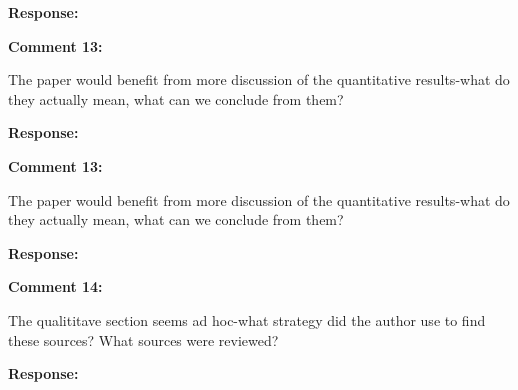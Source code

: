 \documentclass[12pt, a4paper, notitlepage]{article}
\begin{document}
\noindent\textbf{Response:}



\vspace{15pt}
\noindent\textbf{Comment 13:}
\begin{displayquote}
The paper would benefit from more discussion of the quantitative results-what do they actually mean, what can we conclude from them?
\end{displayquote}

\noindent\textbf{Response:}


\vspace{15pt}
\noindent\textbf{Comment 13:}
\begin{displayquote}
The paper would benefit from more discussion of the quantitative results-what do they actually mean, what can we conclude from them?
\end{displayquote}

\noindent\textbf{Response:}

\vspace{15pt}
\noindent\textbf{Comment 14:}
\begin{displayquote}
The qualititave section seems ad hoc-what strategy did the author use to find these sources? What sources were reviewed?
\end{displayquote}


\noindent\textbf{Response:}


\newpage


\end{document}

